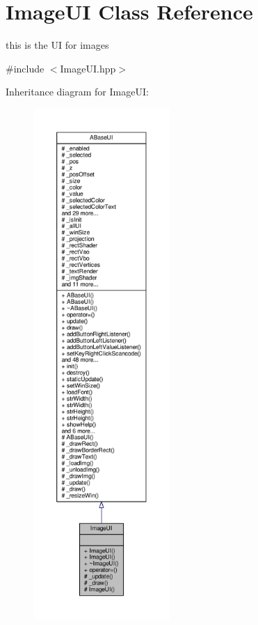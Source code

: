 \hypertarget{class_image_u_i}{}\section{Image\+UI Class Reference}
\label{class_image_u_i}


this is the UI for images  




{\ttfamily \#include $<$Image\+U\+I.\+hpp$>$}



Inheritance diagram for Image\+UI\+:
\nopagebreak
\begin{figure}[H]
\begin{center}
\leavevmode
\includegraphics[height=550pt]{class_image_u_i__inherit__graph}
\end{center}
\end{figure}



